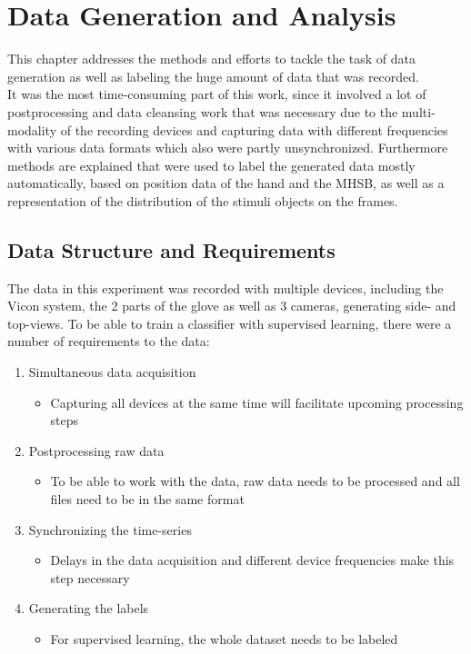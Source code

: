 
\chapter{Data Generation and Analysis} %

\label{Data} %

This chapter addresses the methods and efforts to tackle the task of data generation as well as labeling the huge amount of data that was recorded.\\
It was the most time-consuming part of this work, since it involved a lot of postprocessing and data cleansing work that was necessary due to the multi-modality of the recording devices and capturing data with different frequencies with various data formats which also were partly unsynchronized. Furthermore methods are explained that were used to label the generated data mostly automatically, based on position data of the hand and the MHSB, as well as a representation of the distribution of the stimuli objects on the frames.

\section{Data Structure and Requirements}
The data in this experiment was recorded with multiple devices, including the Vicon system, the 2 parts of the glove as well as 3 cameras, generating side- and top-views. To be able to train a classifier with supervised learning, there were a number of requirements to the data:
\begin{enumerate}
\item Simultaneous data acquisition
\begin{itemize}
\item Capturing all devices at the same time will facilitate upcoming processing steps
\end{itemize}
\item Postprocessing raw data
\begin{itemize}
\item To be able to work with the data, raw data needs to be processed and all files need to be in the same format
\end{itemize}
\item Synchronizing the time-series
\begin{itemize}
\item Delays in the data acquisition and different device frequencies make this step necessary
\end{itemize}
\item Generating the labels
\begin{itemize}
\item For supervised learning, the whole dataset needs to be labeled
\end{itemize}
\end{enumerate}
